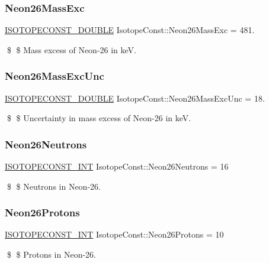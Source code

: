 \subsubsection{\texorpdfstring{Neon26\+Mass\+Exc}{Neon26MassExc}}
{\footnotesize\ttfamily \mbox{\hyperlink{group___isotope_const-_macros_ga8f45a7272ce02c0b4c65c44636ed719a}{I\+S\+O\+T\+O\+P\+E\+C\+O\+N\+S\+T\+\_\+\+D\+O\+U\+B\+LE}} Isotope\+Const\+::\+Neon26\+Mass\+Exc = 481.}

\$ \$ Mass excess of Neon-\/26 in keV. \mbox{\label{group___isotope_const-_neon-_ne26_ga99ec245c8a75f03c9b1c1c80b4196aae}} 
\subsubsection{\texorpdfstring{Neon26\+Mass\+Exc\+Unc}{Neon26MassExcUnc}}
{\footnotesize\ttfamily \mbox{\hyperlink{group___isotope_const-_macros_ga8f45a7272ce02c0b4c65c44636ed719a}{I\+S\+O\+T\+O\+P\+E\+C\+O\+N\+S\+T\+\_\+\+D\+O\+U\+B\+LE}} Isotope\+Const\+::\+Neon26\+Mass\+Exc\+Unc = 18.}

\$ \$ Uncertainty in mass excess of Neon-\/26 in keV. \mbox{\label{group___isotope_const-_neon-_ne26_ga27ed594bb7a4234604b501fed661d27a}} 
\subsubsection{\texorpdfstring{Neon26\+Neutrons}{Neon26Neutrons}}
{\footnotesize\ttfamily \mbox{\hyperlink{group___isotope_const-_macros_ga5f18360b3e99483a35c32d789e62621c}{I\+S\+O\+T\+O\+P\+E\+C\+O\+N\+S\+T\+\_\+\+I\+NT}} Isotope\+Const\+::\+Neon26\+Neutrons = 16}

\$ \$ Neutrons in Neon-\/26. \mbox{\label{group___isotope_const-_neon-_ne26_ga7fe6fa8f075f192ab70aa939f91c5d00}} 
\subsubsection{\texorpdfstring{Neon26\+Protons}{Neon26Protons}}
{\footnotesize\ttfamily \mbox{\hyperlink{group___isotope_const-_macros_ga5f18360b3e99483a35c32d789e62621c}{I\+S\+O\+T\+O\+P\+E\+C\+O\+N\+S\+T\+\_\+\+I\+NT}} Isotope\+Const\+::\+Neon26\+Protons = 10}

\$ \$ Protons in Neon-\/26. 